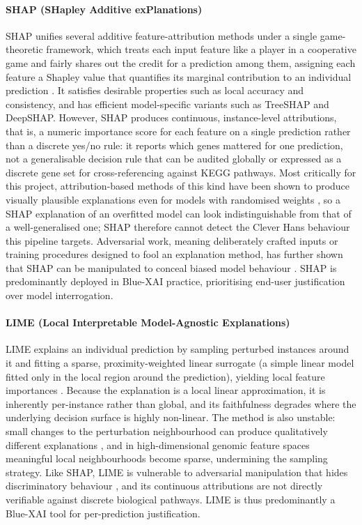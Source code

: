 \paragraph{SHAP (SHapley Additive exPlanations)}
SHAP unifies several additive feature-attribution methods under a single game-theoretic framework,
which treats each input feature like a player in a cooperative game and fairly shares out the credit
for a prediction among them, assigning each feature a Shapley value that quantifies its marginal
contribution to an individual prediction \cite{Lundberg2017}. It satisfies desirable properties such as
local accuracy and consistency, and has efficient model-specific variants such as TreeSHAP and
DeepSHAP. However, SHAP produces continuous, instance-level attributions, that is, a numeric importance
score for each feature on a single prediction rather than a discrete yes/no rule: it reports which genes
mattered for one prediction, not a generalisable decision rule that can be audited globally or expressed
as a discrete gene set for cross-referencing against KEGG pathways. Most critically for this project,
attribution-based methods of this kind have been shown to produce visually plausible explanations even
for models with randomised weights \cite{Adebayo2018}, so a SHAP explanation of an overfitted model can
look indistinguishable from that of a well-generalised one; SHAP therefore cannot detect the Clever Hans
behaviour this pipeline targets. Adversarial work, meaning deliberately crafted inputs or training
procedures designed to fool an explanation method, has further shown that SHAP can be manipulated to
conceal biased model behaviour \cite{Slack2020}. SHAP is predominantly deployed in Blue-XAI practice,
prioritising end-user justification over model interrogation.

\paragraph{LIME (Local Interpretable Model-Agnostic Explanations)}
LIME explains an individual prediction by sampling perturbed instances around it and fitting a sparse,
proximity-weighted linear surrogate (a simple linear model fitted only in the local region around the
prediction), yielding local feature importances \cite{Ribeiro2016}. Because the explanation is a local
linear approximation, it is inherently per-instance rather than global, and its faithfulness degrades
where the underlying decision surface is highly non-linear. The method is also unstable: small changes
to the perturbation neighbourhood can produce qualitatively different explanations
\cite{AlvarezMelis2018}, and in high-dimensional genomic feature spaces meaningful local neighbourhoods
become sparse, undermining the sampling strategy. Like SHAP, LIME is vulnerable to adversarial
manipulation that hides discriminatory behaviour \cite{Slack2020}, and its continuous attributions are
not directly verifiable against discrete biological pathways. LIME is thus predominantly a Blue-XAI tool
for per-prediction justification.


